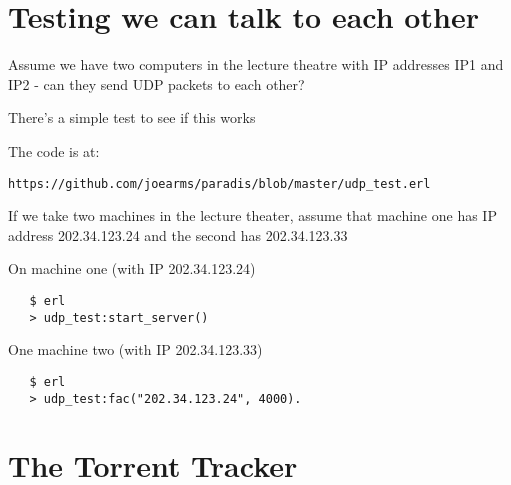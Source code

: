 \documentclass[10pt]{article}
\begin{document}
\section{Testing we can talk to each other}

Assume we have two computers in the lecture theatre with IP addresses IP1
and IP2 - can they send UDP packets to each other?

There's a simple test to see if this works

The code is at:

\verb+https://github.com/joearms/paradis/blob/master/udp_test.erl+

If we take two machines in the lecture theater, assume that machine one has
IP address 202.34.123.24 and the second has 202.34.123.33

On machine one (with IP 202.34.123.24)

\begin{verbatim}
   $ erl
   > udp_test:start_server()
\end{verbatim}

One machine two (with IP 202.34.123.33)

\begin{verbatim}
   $ erl
   > udp_test:fac("202.34.123.24", 4000).
\end{verbatim}

\section{The Torrent Tracker}
\end{document}
